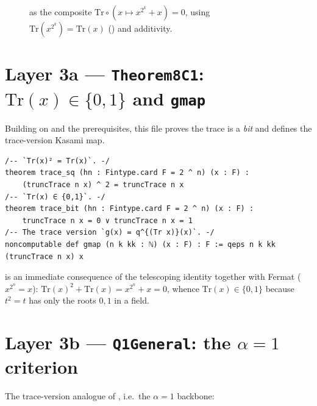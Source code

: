 \documentclass[11pt]{article}
\theoremstyle{definition}
\begin{document}
\begin{figure}[h]
\centering
{}
\caption{ as the composite
$\mathrm{Tr}\circ(x\mapsto x^{2^k}+x)=0$, using
$\mathrm{Tr}(x^{2^k})=\mathrm{Tr}(x)$ () and additivity.}
\end{figure}

\section{Layer 3a --- \texttt{Theorem8C1}: $\mathrm{Tr}(x)\in\{0,1\}$ and \texttt{gmap}}

Building on  and the prerequisites, this file proves the trace is a
\emph{bit} and defines the trace-version Kasami map.

\begin{lstlisting}
/-- `Tr(x)² = Tr(x)`. -/
theorem trace_sq (hn : Fintype.card F = 2 ^ n) (x : F) :
    (truncTrace n x) ^ 2 = truncTrace n x
/-- `Tr(x) ∈ {0,1}`. -/
theorem trace_bit (hn : Fintype.card F = 2 ^ n) (x : F) :
    truncTrace n x = 0 ∨ truncTrace n x = 1
/-- The trace version `g(x) = q^{(Tr x)}(x)`. -/
noncomputable def gmap (n k kk : ℕ) (x : F) : F := qeps n k kk (truncTrace n x) x
\end{lstlisting}

 is an immediate consequence of the telescoping identity together
with Fermat ($x^{2^n}=x$): $\mathrm{Tr}(x)^2+\mathrm{Tr}(x)=x^{2^n}+x=0$, whence
$\mathrm{Tr}(x)\in\{0,1\}$ because $t^2=t$ has only the roots $0,1$ in a field.

\section{Layer 3b --- \texttt{Q1General}: the $\alpha=1$ criterion}

The trace-version analogue of , i.e.\ the $\alpha=1$ backbone:
\end{document}
